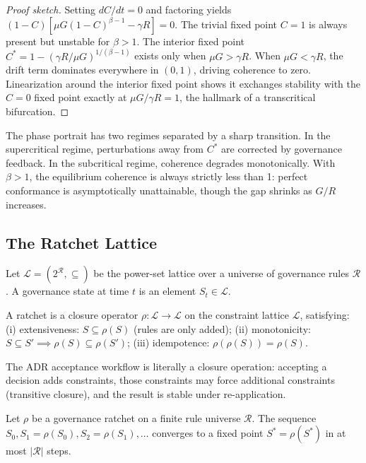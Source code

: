 \begin{proof}[Proof sketch]
Setting $dC/dt = 0$ and factoring yields $(1 - C)[\mu G (1 - C)^{\beta - 1} - \gamma R] = 0$. The trivial fixed point $C = 1$ is always present but unstable for $\beta > 1$. The interior fixed point $C^* = 1 - (\gamma R / \mu G)^{1/(\beta - 1)}$ exists only when $\mu G > \gamma R$. When $\mu G < \gamma R$, the drift term dominates everywhere in $(0, 1)$, driving coherence to zero. Linearization around the interior fixed point shows it exchanges stability with the $C = 0$ fixed point exactly at $\mu G / \gamma R = 1$, the hallmark of a transcritical bifurcation.
\end{proof}

The phase portrait has two regimes separated by a sharp transition. In the supercritical regime, perturbations away from $C^*$ are corrected by governance feedback. In the subcritical regime, coherence degrades monotonically. With $\beta > 1$, the equilibrium coherence is always strictly less than 1: perfect conformance is asymptotically unattainable, though the gap shrinks as $G/R$ increases.

\subsection{The Ratchet Lattice}

Let $\mathcal{L} = (2^{\mathcal{R}}, \subseteq)$ be the power-set lattice over a universe of governance rules $\mathcal{R}$. A governance state at time $t$ is an element $S_t \in \mathcal{L}$.

\begin{definition}
\label{def:ratchet}
A ratchet is a closure operator $\rho: \mathcal{L} \to \mathcal{L}$ on the constraint lattice $\mathcal{L}$, satisfying: (i) extensiveness: $S \subseteq \rho(S)$ (rules are only added); (ii) monotonicity: $S \subseteq S' \implies \rho(S) \subseteq \rho(S')$; (iii) idempotence: $\rho(\rho(S)) = \rho(S)$.
\end{definition}

The ADR acceptance workflow is literally a closure operation: accepting a decision adds constraints, those constraints may force additional constraints (transitive closure), and the result is stable under re-application.

\begin{theorem}
\label{thm:ratchet-convergence}
Let $\rho$ be a governance ratchet on a finite rule universe $\mathcal{R}$. The sequence $S_0, S_1 = \rho(S_0), S_2 = \rho(S_1), \ldots$ converges to a fixed point $S^* = \rho(S^*)$ in at most $|\mathcal{R}|$ steps.
\end{theorem}

